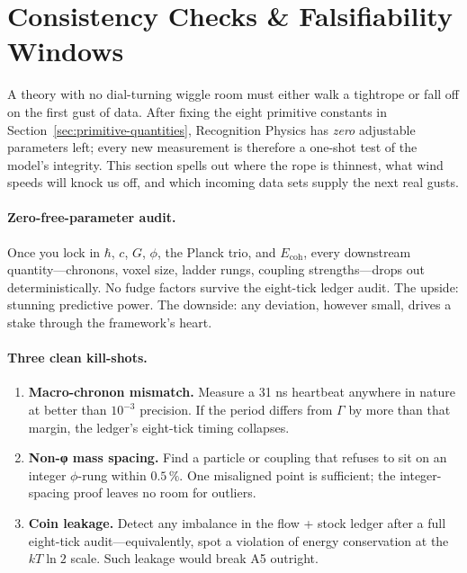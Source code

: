 \documentclass[11pt,oneside]{book}
\begin{document}
\section{Consistency Checks \& Falsifiability Windows}
\label{sec:consistency}

A theory with no dial-turning wiggle room must either walk a tightrope or fall
off on the first gust of data.  After fixing the eight primitive constants in
Section~\ref{sec:primitive-quantities}, Recognition Physics has \emph{zero}
adjustable parameters left; every new measurement is therefore a one-shot test
of the model’s integrity.  This section spells out where the rope is thinnest,
what wind speeds will knock us off, and which incoming data sets supply the
next real gusts.

\paragraph{Zero-free-parameter audit.}
Once you lock in $\hbar$, $c$, $G$, $\phi$, the Planck trio, and
$E_{\text{coh}}$, every downstream quantity—chronons, voxel size, ladder
rungs, coupling strengths—drops out deterministically.  No fudge factors
survive the eight-tick ledger audit.  The upside: stunning predictive power.
The downside: any deviation, however small, drives a stake through the
framework’s heart.

\paragraph{Three clean kill-shots.}
\begin{enumerate}
  \item \textbf{Macro-chronon mismatch.}  
        Measure a 31 ns heartbeat anywhere in nature at better than
        $10^{-3}$ precision.  If the period differs from $\Gamma$ by more than
        that margin, the ledger’s eight-tick timing collapses.
  \item \textbf{Non-φ mass spacing.}  
        Find a particle or coupling that refuses to sit on an integer
        $\phi$-rung within $0.5\,\%$.  One misaligned point is sufficient;
        the integer-spacing proof leaves no room for outliers.
  \item \textbf{Coin leakage.}  
        Detect any imbalance in the flow + stock ledger after a full
        eight-tick audit—equivalently, spot a violation of energy conservation
        at the $kT\ln2$ scale.  Such leakage would break A5 outright.
\end{enumerate}
\end{document}
